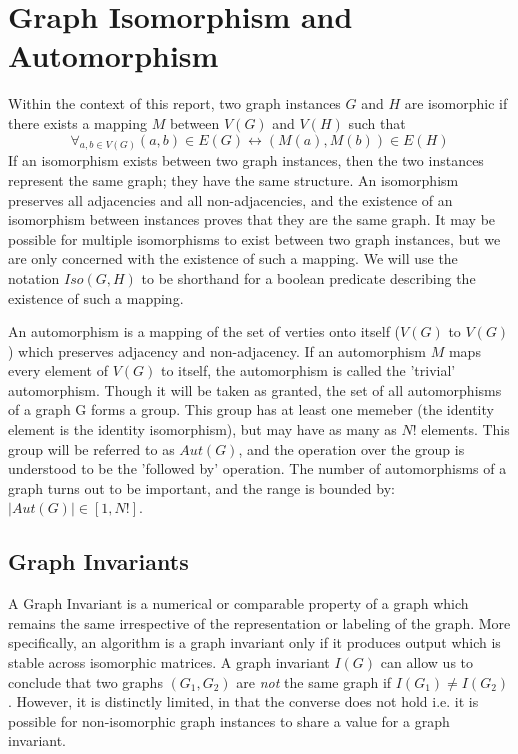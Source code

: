 \documentclass[11pt,a4paper]{report}
\begin{document}
\section{Graph Isomorphism and Automorphism}
Within the context of this report, two graph instances $G$ and $H$ are isomorphic if there exists a mapping $M$ between $V(G)$ and $V(H)$ such that $$\forall_{a, b \in V(G)} (a, b) \in E(G) \leftrightarrow (M(a), M(b)) \in E(H)$$
If an isomorphism exists between two graph instances, then the two instances represent the same graph; they have the same structure.
An isomorphism preserves all adjacencies and all non-adjacencies, and the existence of an isomorphism between instances proves that they are the same graph.
It may be possible for multiple isomorphisms to exist between two graph instances, but we are only concerned with the existence of such a mapping.
We will use the notation $Iso(G, H)$ to be shorthand for a boolean predicate describing the existence of such a mapping.

An automorphism is a mapping of the set of verties onto itself ($V(G)$ to $V(G)$) which preserves adjacency and non-adjacency.
If an automorphism $M$ maps every element of $V(G)$ to itself, the automorphism is called the 'trivial' automorphism.
Though it will be taken as granted, the set of all automorphisms of a graph G forms a group.
This group has at least one memeber (the identity element is the identity isomorphism), but may have as many as $N!$ elements.
This group will be referred to as $Aut(G)$, and the operation over the group is understood to be the 'followed by' operation.
The number of automorphisms of a graph turns out to be important, and the range is bounded by: $|Aut(G)| \in [1, N!]$.

\subsection{Graph Invariants}
A Graph Invariant is a numerical or comparable property of a graph which remains the same irrespective of the representation or labeling of the graph.
More specifically, an algorithm is a graph invariant only if it produces output which is stable across isomorphic matrices.
A graph invariant $I(G)$ can allow us to conclude that two graphs $(G_1, G_2)$ are \emph{not} the same graph if $I(G_1) \neq I(G_2)$.
However, it is distinctly limited, in that the converse does not hold i.e. it is possible for non-isomorphic graph instances to share a value for a graph invariant.
\end{document}
